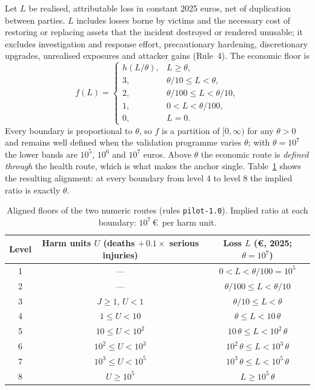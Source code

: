 \documentclass[11pt,a4paper]{article}
\begin{document}
Let $L$ be realised, attributable loss in constant 2025 euros, net of duplication between parties. $L$ includes losses borne by victims and the necessary cost of restoring or replacing assets that the incident destroyed or rendered unusable; it excludes investigation and response effort, precautionary hardening, discretionary upgrades, unrealised exposures and attacker gains (Rule~4). The economic floor is
\begin{equation}
f(L) =
\begin{cases}
h(L/\theta), & L \ge \theta,\\
3, & \theta/10 \le L < \theta,\\
2, & \theta/100 \le L < \theta/10,\\
1, & 0 < L < \theta/100,\\
0, & L = 0 .
\end{cases}
\label{eq:f}
\end{equation}
Every boundary is proportional to $\theta$, so $f$ is a partition of $[0,\infty)$ for any $\theta > 0$ and remains well defined when the validation programme varies $\theta$; with $\theta = 10^{7}$ the lower bands are $10^{5}$, $10^{6}$ and $10^{7}$ euros. Above $\theta$ the economic route is \emph{defined through} the health route, which is what makes the anchor single. Table~\ref{tab:routes} shows the resulting alignment: at every boundary from level 4 to level 8 the implied ratio is exactly $\theta$.

\begin{table}[ht]
\centering\footnotesize
\caption{Aligned floors of the two numeric routes (rules \texttt{pilot-1.0}). Implied ratio at each boundary: $10^{7}$\,\euro\ per harm unit.}
\label{tab:routes}
\begin{tabular}{@{}ccc@{}}
\toprule
Level & Harm units $U$ (deaths $+\,0.1\times$ serious injuries) & Loss $L$ (\euro, 2025; $\theta = 10^{7}$) \\
\midrule
1 & --- & $0 < L < \theta/100 = 10^{5}$ \\
2 & --- & $\theta/100 \le L < \theta/10$ \\
3 & $J \ge 1$, $U<1$ & $\theta/10 \le L < \theta$ \\
4 & $1 \le U < 10$ & $\theta \le L < 10\,\theta$ \\
5 & $10 \le U < 10^{2}$ & $10\,\theta \le L < 10^{2}\,\theta$ \\
6 & $10^{2} \le U < 10^{3}$ & $10^{2}\,\theta \le L < 10^{3}\,\theta$ \\
7 & $10^{3} \le U < 10^{5}$ & $10^{3}\,\theta \le L < 10^{5}\,\theta$ \\
8 & $U \ge 10^{5}$ & $L \ge 10^{5}\,\theta$ \\
\bottomrule
\end{tabular}
\end{table}
\end{document}
